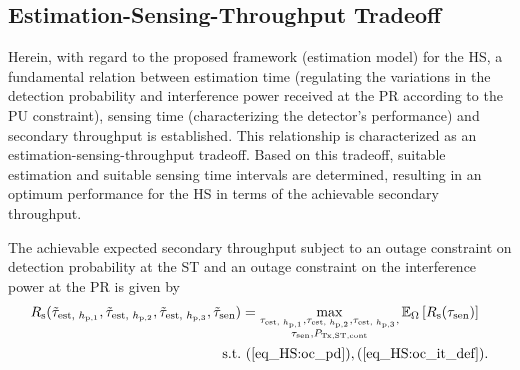 \subsection{Estimation-Sensing-Throughput Tradeoff}
Herein, with regard to the proposed framework (estimation model) for the HS, a fundamental relation between estimation time (regulating the variations in the detection probability and interference power received at the PR according to the PU constraint), sensing time (characterizing the detector's performance) and secondary throughput is established. This relationship is characterized as an estimation-sensing-throughput tradeoff. Based on this tradeoff, suitable estimation and suitable sensing time intervals are determined, resulting in an optimum performance for the HS in terms of the achievable secondary throughput. 
\begin{theorem} \label{th_HS:th1}
\normalfont
The achievable expected secondary throughput subject to an outage constraint on detection probability at the ST and an outage constraint on the interference power at the PR is given by
\begin{align}
R_{\text{s}}(\tilde{\tau}_{\text{est, $h_{\text{p,1}}$}}, \tilde{\tau}_{\text{est, $h_{\text{p,2}}$}}, \tilde{\tau}_{\text{est, $h_{\text{p,3}}$}}, \tilde{\tau}_{\text{sen}}) &= \operatorname*{max}_{\substack{\tau_{\text{est, $h_{\text{p,1}}$}}, \tau_{\text{est, $h_{\text{p,2}}$}}, \tau_{\text{est, $h_{\text{p,3}}$}}, \\ \tau_{\text{sen}}, P_{\text{Tx,ST,cont}}}} {\mathbb E}_{\Omega}\left[ R_{\text{s}}(\tau_{\text{sen}}) \right] \label{eq_HS:opT_em}\\
\text{s.t.} & \text{ } (\ref{eq_HS:oc_pd}), (\ref{eq_HS:oc_it_def}). \nonumber 
\end{align}
\end{theorem}
